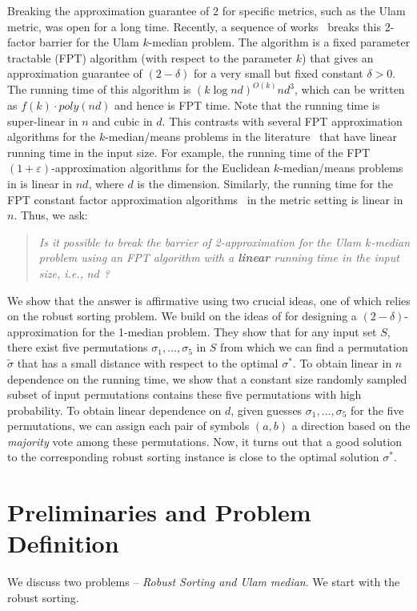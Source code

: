 \documentclass[11pt]{llncs}
\newcommand{\veps}{\varepsilon}
\begin{document}
Breaking the approximation guarantee of $2$ for specific metrics, such as the Ulam metric, was open for a long time. Recently, a sequence of works~\cite{cdk21,cdk23} breaks this 2-factor barrier for the Ulam $k$-median problem. The algorithm is a fixed parameter tractable (FPT) algorithm (with respect to the parameter $k$) that gives an approximation guarantee of $(2 - \delta)$ for a very small but fixed constant $\delta > 0$. The running time of this algorithm is $(k \log{nd})^{O(k)} nd^3$, which can be written as $f(k)\cdot poly(nd)$ and hence is FPT time.
Note that the running time is super-linear in $n$ and cubic in $d$.
This contrasts with several FPT approximation algorithms for the $k$-median/means problems in the literature~\cite{kss,jks,bjk18,bgjk20,gj20}  that have linear running time in the input size. For example, the running time of the FPT $(1+\veps)$-approximation algorithms for the Euclidean $k$-median/means problems in \cite{kss,jks,bjk18,bgjk20}  is linear in $nd$, where $d$ is the dimension. Similarly, the running time for the FPT constant factor approximation algorithms~\cite{gj20} in the metric setting is linear in $n$. Thus, we ask: 
\begin{quote}
{\it Is it possible to break the barrier of 2-approximation for the Ulam $k$-median problem using an FPT algorithm with a \textbf{linear} running time in the input size, i.e., $nd$ ?}
\end{quote}

We show that the answer is affirmative using two crucial ideas, one of which relies on the robust sorting problem.
We build on the ideas of \cite{cdk23} for designing a $(2-\delta)$-approximation for the 1-median problem. They show that for any input set $S$, there exist five permutations $\sigma_1, ..., \sigma_5$ in $S$ from which we can find a permutation $\tilde{\sigma}$ that has a small distance with respect to the optimal $\sigma^*$. To obtain linear in $n$ dependence on the running time, we show that a constant size randomly sampled subset of input permutations contains these five permutations with high probability. To obtain linear dependence on $d$, given guesses $\sigma_1, ..., \sigma_5$ for the five permutations, we can assign each pair of symbols $(a,b)$ a direction based on the {\em majority} vote among these permutations. Now, it turns out that a good solution to the corresponding robust sorting instance is close to the optimal solution $\sigma^*$. 


\section{Preliminaries and Problem Definition}
We discuss two problems -- {\em Robust Sorting and Ulam median}. We start with the robust sorting.\\
\end{document}
